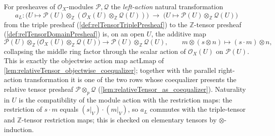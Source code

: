 \begin{definition}
  \label{def:relTensorActL}
  For presheaves of \(\mathcal{O}_X\)-modules \(\mathcal{P}, \mathcal{Q}\) the
  \emph{left-action} natural transformation
  \[
    a_L : \bigl(U \mapsto \mathcal{P}(U) \otimes_{\mathbb{Z}}
      (\mathcal{O}_X(U) \otimes_{\mathbb{Z}} \mathcal{Q}(U))\bigr)
    \;\longrightarrow\;
    \bigl(U \mapsto \mathcal{P}(U) \otimes_{\mathbb{Z}} \mathcal{Q}(U)\bigr)
  \]
  from the triple presheaf (\cref{def:relTensorTriplePresheaf}) to the
  \(\mathbb{Z}\)-tensor presheaf (\cref{def:relTensorDomainPresheaf}) is, on an
  open \(U\), the additive map
  \[
    \mathcal{P}(U) \otimes_{\mathbb{Z}}
      \bigl(\mathcal{O}_X(U) \otimes_{\mathbb{Z}} \mathcal{Q}(U)\bigr)
    \longrightarrow
    \mathcal{P}(U) \otimes_{\mathbb{Z}} \mathcal{Q}(U),
    \qquad
    m \otimes (s \otimes n) \longmapsto (s \cdot m) \otimes n,
  \]
  collapsing the middle ring factor through the scalar action of
  \(\mathcal{O}_X(U)\) on \(\mathcal{P}(U)\). This is exactly the objectwise
  action map \(\mathrm{actLmap}\) of
  \cref{lem:relativeTensor_objectwise_coequalizer}; together with the parallel
  right-action transformation it is one of the two rows whose coequalizer
  presents the relative tensor presheaf \(\mathcal{P} \otimes_p \mathcal{Q}\)
  (\cref{lem:relativeTensor_as_coequalizer}). Naturality in \(U\) is the
  compatibility of the module action with the restriction maps: the restriction
  of \(s \cdot m\) equals \((s|_V) \cdot (m|_V)\), so \(a_L\) commutes with the
  triple-tensor and \(\mathbb{Z}\)-tensor restriction maps; this is checked on
  elementary tensors by \(\otimes\)-induction.
\end{definition}

